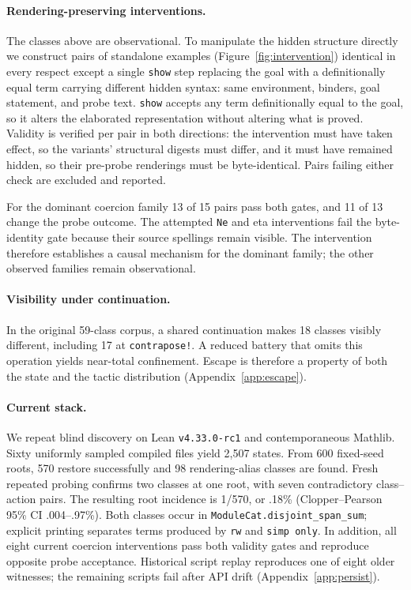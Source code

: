\documentclass[11pt]{article}
\begin{document}
\paragraph{Rendering-preserving interventions.}
The classes above are observational. To manipulate the hidden structure
directly we construct pairs of standalone examples (Figure~\ref{fig:intervention}) identical in every respect
except a single \texttt{show} step replacing the goal with a definitionally
equal term carrying different hidden syntax: same environment, binders, goal
statement, and probe text. \texttt{show} accepts any term definitionally equal
to the goal, so it alters the elaborated representation without altering what
is proved. Validity is verified per pair in both directions: the intervention
must have taken effect, so the variants' structural digests must differ, and it
must have remained hidden, so their pre-probe renderings must be byte-identical.
Pairs failing either check are excluded and reported.

For the dominant coercion family 13 of 15 pairs pass both gates, and 11 of 13
change the probe outcome. The attempted \texttt{Ne} and eta interventions fail
the byte-identity gate because their source spellings remain visible. The
intervention therefore establishes a causal mechanism for the dominant family;
the other observed families remain observational.

\paragraph{Visibility under continuation.}
In the original 59-class corpus, a shared continuation makes 18 classes visibly
different, including 17 at
\texttt{contrapose!}. A reduced battery that omits this operation yields
near-total confinement. Escape is therefore a property of both the state and
the tactic distribution (Appendix~\ref{app:escape}).

\paragraph{Current stack.}
We repeat blind discovery on Lean \texttt{v4.33.0-rc1} and contemporaneous
Mathlib. Sixty uniformly sampled compiled files yield 2{,}507 states. From 600
fixed-seed roots, 570 restore successfully and 98 rendering-alias classes are
found. Fresh repeated probing confirms two classes at one root, with seven
contradictory class--action pairs. The resulting root incidence is 1/570, or
.18\% (Clopper--Pearson 95\% CI .004--.97\%). Both classes occur in
\texttt{ModuleCat.disjoint\_span\_sum}; explicit printing separates terms
produced by \texttt{rw} and \texttt{simp only}. In addition, all eight current
coercion interventions pass both validity gates and reproduce opposite probe
acceptance. Historical script replay reproduces one of eight older witnesses;
the remaining scripts fail after API drift (Appendix~\ref{app:persist}).
\end{document}
